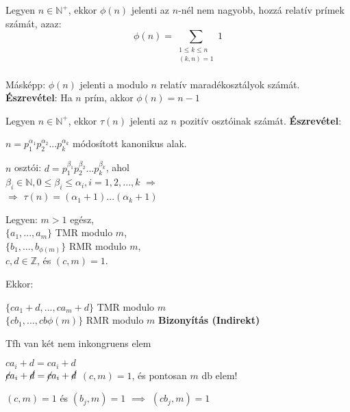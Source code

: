 \begin{frame}
  \begin{tcolorbox}[title={Def.: Az Euler-féle $\phi$ függvény}]
    Legyen $n \in \mathbb{N}^+$, ekkor ${\phi}(n)$ jelenti az $n$-nél nem nagyobb, hozzá relatív prímek számát, azaz:\\
    $${\phi}(n) = \sum_{\substack{1 \leq k \leq n \\ (k, n) = 1}} 1$$\\

    Másképp: ${\phi}(n)$ jelenti a modulo $n$ relatív maradékosztályok számát.
  \tcblower
    \textbf{Észrevétel}: Ha $n$ prím, akkor ${\phi}(n) = n - 1$
  \end{tcolorbox}

  \begin{tcolorbox}[title={Def.: A $\tau$ függvény}]
    Legyen $n \in \mathbb{N}^+$, ekkor ${\tau}(n)$ jelenti az $n$ pozitív osztóinak számát.
  \tcblower
    \textbf{Észrevétel}:\\
    \msmallskip


    $n = p_1^{{\alpha}_1}p_2^{{\alpha}_2}...p_k^{{\alpha}_k}$ módosított kanonikus alak.\\
    \msmallskip
    
    $n$ osztói: $d = p_1^{{\beta}_1}p_2^{{\beta}_2}...p_k^{{\beta}_k}$, ahol\\
    ${\beta}_i \in \mathbb{N}, 0 \leq {\beta}_i \leq {\alpha}_i, i = 1, 2, ..., k$ $\Rightarrow$\\
    $\Rightarrow$ ${\tau}(n) = ({\alpha}_1 + 1)...({\alpha}_k + 1)$
  \end{tcolorbox}
\end{frame}

\begin{frame}
  \begin{tcolorbox}[title={Tétel: Omnibusz tétel}]
    Legyen: $m > 1$ egész,\\
    $\{a_1, ..., a_m\}$ TMR modulo $m$,\\
    $\{b_1, ..., b_{{\phi}(m)}\}$ RMR modulo $m$,\\
    $c, d \in \mathbb{Z}$, és $(c,m) = 1$.\\
    \smallskip

    Ekkor:\\
    \smallskip

    $\{ ca_1 + d, ..., ca_m + d \}$ TMR modulo $m$\\
    $\{ cb_1, ..., cb{{\phi}(m)}\}$ RMR modulo $m$
  \tcblower
    \textbf{Bizonyítás (Indirekt)}
    \mmedskip
    
    Tfh van két nem inkongruens elem\\
    \msmallskip
    
    $ca_i + d = ca_i + d$\\
    ${\cancel{c}}a_i + {\cancel{d}} = {\cancel{c}}a_i + {\cancel{d}}$ $(c, m) = 1$, és pontosan $m$ db elem!\\
    \msmallskip
    
    $(c, m) = 1$ és $(b_j,m) = 1$ $\implies$ $(cb_j, m) = 1$
  \end{tcolorbox}
\end{frame}

